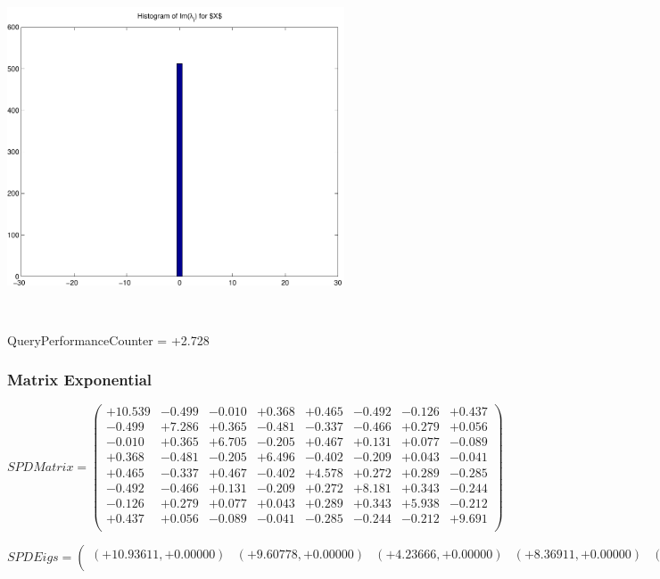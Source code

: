 \documentclass[9pt]{article}
\theoremstyle{plain}
\theoremstyle{definition}
\theoremstyle{remark}
\numberwithin{equation}{section}
\begin{document}
\includegraphics[width=10.0cm,height=10.0cm]{Im_lambda_n.pdf}

QueryPerformanceCounter  =  +2.728
\subsubsection{Matrix Exponential }
$SPD Matrix = \left(
\begin{array}{
cccccccc}
+10.539 & -0.499 & -0.010 & +0.368 & +0.465 & -0.492 & -0.126 & +0.437 \\
-0.499 & +7.286 & +0.365 & -0.481 & -0.337 & -0.466 & +0.279 & +0.056 \\
-0.010 & +0.365 & +6.705 & -0.205 & +0.467 & +0.131 & +0.077 & -0.089 \\
+0.368 & -0.481 & -0.205 & +6.496 & -0.402 & -0.209 & +0.043 & -0.041 \\
+0.465 & -0.337 & +0.467 & -0.402 & +4.578 & +0.272 & +0.289 & -0.285 \\
-0.492 & -0.466 & +0.131 & -0.209 & +0.272 & +8.181 & +0.343 & -0.244 \\
-0.126 & +0.279 & +0.077 & +0.043 & +0.289 & +0.343 & +5.938 & -0.212 \\
+0.437 & +0.056 & -0.089 & -0.041 & -0.285 & -0.244 & -0.212 & +9.691 \\
\end{array}
\right)$ \newline 

$SPD Eigs = \left(
\begin{array}{
cccccccc}
(+10.93611,+0.00000) & (+9.60778,+0.00000) & (+4.23666,+0.00000) & (+8.36911,+0.00000) & (+7.56229,+0.00000) & (+5.82791,+0.00000) & (+6.54198,+0.00000) & (+6.33139,+0.00000) \\
\end{array}
\right)$ \newline 
\end{document}
